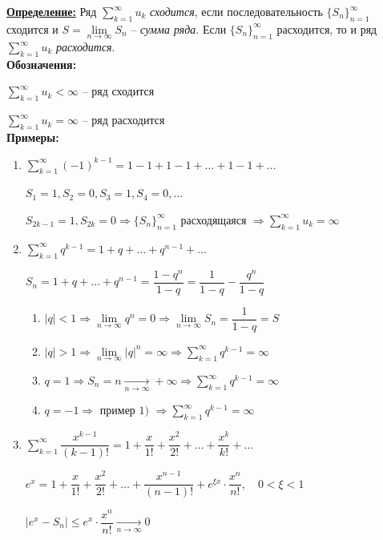 \documentclass[a4paper,12pt]{article} %
\newcommand{\useries}{\sum\limits_{k=1}^{\infty} u_k}
\newcommand{\useriesl}{\sum\limits_{k=1}^{\infty} u_k < \infty}
\newcommand{\useriese}{\sum\limits_{k=1}^{\infty} u_k = \infty}
\begin{document}
\underline{\textbf{Определение:}}
Ряд $\useries$ \textit{сходится}, если последовательность $\{{S_n}\}_{n=1}^{\infty}$ сходится и $S = \lim\limits_{n \to \infty} S_n$ -- \textit{сумма ряда}. Если $\{{S_n}\}_{n=1}^{\infty}$ расходится, то и ряд $\useries$ \textit{расходится}.\\

\textbf{Обозначения:}

$\useriesl$ -- ряд сходится

$\useriese$ -- ряд расходится\\

\textbf{Примеры:}

\begin{enumerate}
	\item $\sum\limits_{k=1}^{\infty} (-1)^{k-1} = 1 - 1 + 1 - 1 + \ldots + 1 - 1 + \ldots$
	
	$S_1 = 1, S_2 = 0, S_3 = 1, S_4 = 0, \ldots$
	
	$S_{2k-1} = 1, S_{2k} = 0 \Rightarrow \{{S_n}\}_{n=1}^{\infty} \text{ расходящаяся } \Rightarrow \useriese$
	\item $\sum\limits_{k=1}^{\infty} q^{k-1} = 1 + q + \ldots + q^{n-1} + \ldots$
	
	$S_n = 1 + q + \ldots + q^{n-1} = \dfrac{1 - q^n}{1 - q} = \dfrac{1}{1 - q} - \dfrac{q^n}{1 - q}$
	
	\begin{enumerate}[label=\asbuk*),ref=\asbuk*]
		\item $|q|<1 \Rightarrow \lim\limits_{n \to \infty} q^n = 0 \Rightarrow \lim\limits_{n \to \infty} S_n = \dfrac{1}{1 - q} = S$
		\item $|q|>1 \Rightarrow \lim\limits_{n \to \infty} |q|^n = \infty \Rightarrow \sum\limits_{k=1}^{\infty} q^{k-1} = \infty$
		\item $q=1 \Rightarrow S_n = n \xrightarrow[n \to \infty]{} +\infty \Rightarrow \sum\limits_{k=1}^{\infty} q^{k-1} = \infty$
		\item $q=-1 \Rightarrow \text{ пример 1) } \Rightarrow \sum\limits_{k=1}^{\infty} q^{k-1} = \infty$
	\end{enumerate}

	\item $\sum\limits_{k=1}^{\infty} \dfrac{x^{k-1}}{(k-1)!} = 1 + \dfrac{x}{1!} + \dfrac{x^2}{2!} + \ldots + \dfrac{x^k}{k!} + \ldots$
	
	$e^x = 1 + \dfrac{x}{1!} + \dfrac{x^2}{2!} + \ldots + \dfrac{x^{n-1}}{(n-1)!} + e^{\xi x} \cdot \dfrac{x^n}{n!}, \hspace{1em} 0<\xi<1$
	
	$|e^x - S_n| \leqslant e^x \cdot \dfrac{x^n}{n!} \xrightarrow[n \to \infty]{} 0$
\end{enumerate}
\end{document}
